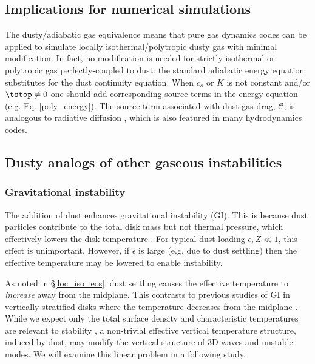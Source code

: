 
\subsection{Implications for numerical simulations}
The dusty/adiabatic gas equivalence means that pure
gas dynamics codes can be applied to simulate locally
isothermal/polytropic dusty gas with minimal modification. In fact, no
modification is needed  
for strictly isothermal or polytropic gas perfectly-coupled to dust:  
the standard adiabatic energy equation substitutes for the dust continuity
equation. When $c_s$ or $K$ is not constant and/or $\tstop\neq0$ one
should add corresponding source terms in the energy equation
(e.g. Eq. \ref{poly_energy}). 
The source term associated with dust-gas drag, $\mathcal{C}$, is 
analogous to radiative diffusion \citep{price15}, which is also
featured in many hydrodynamics codes.      

\subsection{Dusty analogs of other gaseous instabilities}  


\subsubsection{Gravitational instability} %
The addition of dust enhances gravitational
instability (GI). This is because dust particles contribute to the
total disk mass but not thermal pressure, which effectively lowers the
disk temperature \citep[][]{thompson88,shi13}. For typical dust-loading 
$\epsilon, Z\ll1$, this effect is unimportant. However, if $\epsilon$ is
large (e.g. due to dust settling) then the effective temperature may 
be lowered to enable instability. 

As noted in \S\ref{loc_iso_eos}, dust settling causes the effective
temperature to \emph{increase} away from the midplane. This contrasts
to previous studies of GI in vertically stratified disks
 where the temperature decreases
from the midplane \citep[e.g.][]{mamat10, kim12,lin14c}. 
While we expect only the total surface density and
characteristic temperatures are relevant to stability  
\citep{toomre64}, a non-trivial effective vertical temperature
structure, induced by dust, may modify the vertical structure of 3D
waves and unstable modes. We will examine this linear problem in a following 
study.  



